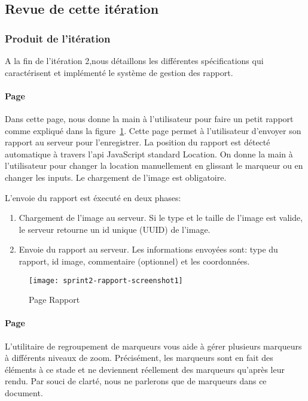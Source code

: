 \subsection{Revue de cette itération}

\subsubsection{Produit de l'itération}

A la fin de l'itération 2,nous détaillons les différentes spécifications qui
caractérisent et implémenté le système de gestion des rapport.

\paragraph{Page }

Dans cette page, nous donne la main à l'utilisateur pour faire un petit rapport
comme expliqué dans la figure~\ref{fig:sprint2-rapport-screenshot1}. Cette page
permet à l'utilisateur d'envoyer son rapport au serveur pour l'enregistrer.
La position du rapport est détecté automatique à travers l'api JavaScript
standard Location. On donne la main à l'utilisateur pour changer la location
manuellement en glissant le marqueur ou en changer les inputs. Le chargement de
l'image est obligatoire.


L'envoie du rapport est éxecuté en deux phases:
\begin{enumerate}
    \item Chargement de l'image au serveur. Si le type et le taille de l'image
        est valide, le serveur retourne un id unique (UUID) de l'image.
    \item Envoie du rapport au serveur. Les informations envoyées sont: type du
        rapport, id image, commentaire (optionnel) et les coordonnées.
\end{enumerate}

\begin{figure}[htbp]
    \centering
    \texttt{[image: sprint2-rapport-screenshot1]}
    \caption{Page Rapport}
    \label{fig:sprint2-rapport-screenshot1}
\end{figure}

\paragraph{Page }
L'utilitaire de regroupement de marqueurs vous aide à gérer plusieurs marqueurs
à différents niveaux de zoom. Précisément, les marqueurs sont en fait des
éléments à ce stade et ne deviennent réellement des marqueurs qu'après leur
rendu. Par souci de clarté, nous ne parlerons que de marqueurs dans ce
document.


